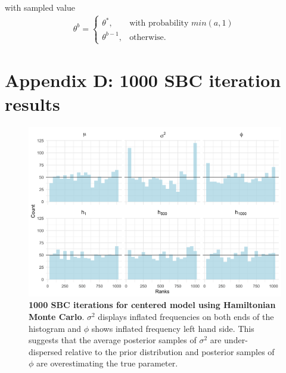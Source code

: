 \documentclass[12pt, a4paper]{article}
\begin{document}
with sampled value
\begin{align}
\theta^b = \begin{cases}
    \theta^{\ast},& \text{with probability } min(a,1)\\
    \theta^{b-1}, & \text{otherwise}.
    \end{cases}
\end{align}

\section{Appendix D: 1000 SBC iteration results}

    \begin{figure}[H]
        \centering
        \includegraphics[scale=0.09]{results/hmc_cp_1k.png}
        \caption{\textbf{1000 SBC iterations for centered model using Hamiltonian Monte Carlo}. $\sigma^2$ displays inflated frequencies on both ends of the histogram and $\phi$ shows inflated frequency left hand side. This suggests that the average posterior samples of $\sigma^2$ are under-dispersed relative to the prior distribution and posterior samples of $\phi$ are overestimating the true parameter.}
        \label{fig:cphmc1k}
    \end{figure} 
\end{document}
